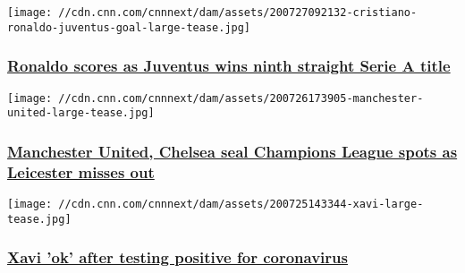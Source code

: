 \href{/2020/07/27/football/juventus-serie-a-champion-cristiano-ronaldo-football-spt-intl/index.html}{}

\texttt{[image: //cdn.cnn.com/cnnnext/dam/assets/200727092132-cristiano-ronaldo-juventus-goal-large-tease.jpg]}

\hypertarget{ronaldo-scores-as-juventus-wins-ninth-straight-serie-a-title}{%
\subsubsection{\texorpdfstring{\href{/2020/07/27/football/juventus-serie-a-champion-cristiano-ronaldo-football-spt-intl/index.html}{Ronaldo
scores as Juventus wins ninth straight Serie A
title}}{Ronaldo scores as Juventus wins ninth straight Serie A title}}\label{ronaldo-scores-as-juventus-wins-ninth-straight-serie-a-title}}

\href{/2020/07/26/football/premier-league-football-manchester-united-chelsea-leicester-spt-intl-gbr/index.html}{}

\texttt{[image: //cdn.cnn.com/cnnnext/dam/assets/200726173905-manchester-united-large-tease.jpg]}

\hypertarget{manchester-united-chelsea-seal-champions-league-spots-as-leicester-misses-out}{%
\subsubsection{\texorpdfstring{\href{/2020/07/26/football/premier-league-football-manchester-united-chelsea-leicester-spt-intl-gbr/index.html}{Manchester
United, Chelsea seal Champions League spots as Leicester misses
out}}{Manchester United, Chelsea seal Champions League spots as Leicester misses out}}\label{manchester-united-chelsea-seal-champions-league-spots-as-leicester-misses-out}}

\href{/2020/07/25/football/xavi-coronavirus-football-spt-intl/index.html}{}

\texttt{[image: //cdn.cnn.com/cnnnext/dam/assets/200725143344-xavi-large-tease.jpg]}

\hypertarget{xavi-ok-after-testing-positive-for-coronavirus}{%
\subsubsection{\texorpdfstring{\href{/2020/07/25/football/xavi-coronavirus-football-spt-intl/index.html}{Xavi
'ok' after testing positive for
coronavirus}}{Xavi 'ok' after testing positive for coronavirus}}\label{xavi-ok-after-testing-positive-for-coronavirus}}

